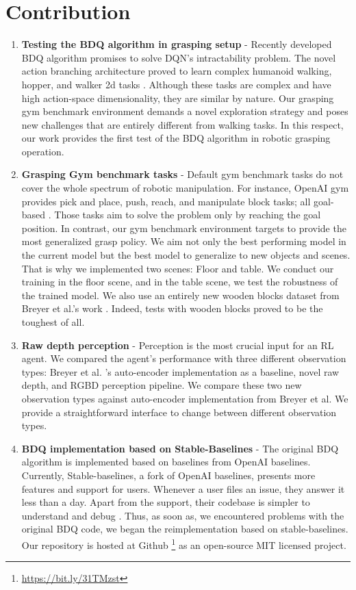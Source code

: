 \section{Contribution}

\begin{enumerate}
    \item \textbf{Testing the BDQ algorithm in grasping setup} - Recently developed BDQ algorithm promises to solve DQN's intractability problem. The novel action branching architecture proved to learn complex humanoid walking, hopper, and walker 2d tasks \cite{Tavakoli2018}. Although these tasks are complex and have high action-space dimensionality, they are similar by nature. Our grasping gym benchmark environment demands a novel exploration strategy and poses new challenges that are entirely different from walking tasks. In this respect, our work provides the first test of the BDQ algorithm in robotic grasping operation.

    \item \textbf{Grasping Gym benchmark tasks} - Default gym benchmark tasks do not cover the whole spectrum of robotic manipulation. For instance, OpenAI gym provides pick and place, push, reach, and manipulate block tasks; all goal-based \cite{OpenAIgym}. Those tasks aim to solve the problem only by reaching the goal position. In contrast, our gym benchmark environment targets to provide the most generalized grasp policy. We aim not only the best performing model in the current model but the best model to generalize to new objects and scenes. That is why we implemented two scenes: Floor and table. We conduct our training in the floor scene, and in the table scene, we test the robustness of the trained model. We also use an entirely new wooden blocks dataset from Breyer et al.'s work \cite{Breyer2018}. Indeed, tests with wooden blocks proved to be the toughest of all. 

    \item \textbf{Raw depth perception} - Perception is the most crucial input for an RL agent. We compared the agent's performance with three different observation types: Breyer et al. 's auto-encoder implementation as a baseline, novel raw depth, and RGBD perception pipeline. We compare these two new observation types against auto-encoder implementation from Breyer et al. We provide a straightforward interface to change between different observation types.

    \item \textbf{BDQ implementation based on Stable-Baselines} - The original BDQ algorithm is implemented based on baselines from OpenAI baselines. Currently, Stable-baselines, a fork of OpenAI baselines, presents more features and support for users. Whenever a user files an issue, they answer it less than a day. Apart from the support, their codebase is simpler to understand and debug \cite{stable-baselines}. Thus, as soon as, we encountered problems with the original BDQ code, we began the reimplementation based on stable-baselines. Our repository is hosted at Github \footnote{\url{https://bit.ly/31TMzst}} as an open-source MIT licensed project.


\end{enumerate}
